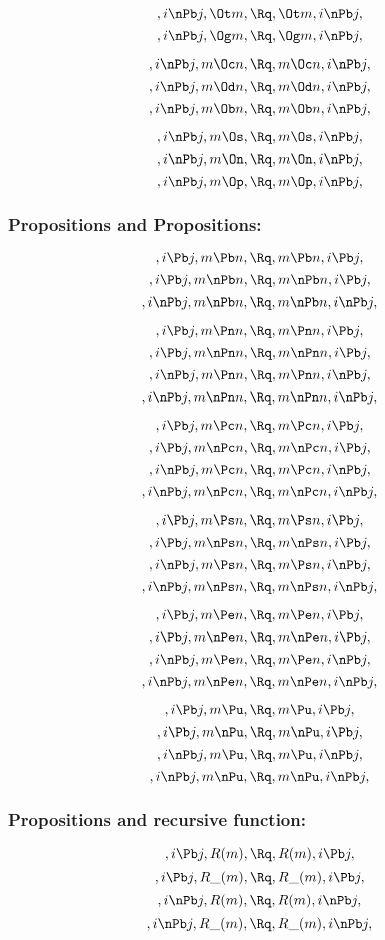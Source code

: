 \bigskip
\bigskip
\[, i \nPb j, \Ot m, \Rq , \Ot m, i \nPb j,\]
\[, i \nPb j, \Og m, \Rq , \Og m, i \nPb j,\]

\[, i \nPb j, m \Oc n, \Rq , m \Oc n, i \nPb j,\]
\[, i \nPb j, m \Od n, \Rq , m \Od n, i \nPb j,\]
\[, i \nPb j, m \Ob n, \Rq , m \Ob n, i \nPb j,\]

\[, i \nPb j, m \Os, \Rq , m \Os, i \nPb j,\]
\[, i \nPb j, m \On, \Rq , m \On, i \nPb j,\]
\[, i \nPb j, m \Op, \Rq , m \Op, i \nPb j,\]


\bigskip
\bigskip
\bigskip
\bigskip
\subsubsection{ Propositions and Propositions:}
\[,i \Pb j, m \Pb n, \Rq , m \Pb n, i \Pb j,\]
\[,i \Pb j, m \nPb n, \Rq , m \nPb n, i \Pb j,\]
\[,i \nPb j, m \nPb n, \Rq , m \nPb n, i \nPb j,\]

\[,i \Pb j, m \Pn n, \Rq , m \Pn n, i \Pb j,\]
\[,i \Pb j, m \nPn n, \Rq , m \nPn n, i \Pb j,\]
\[,i \nPb j, m \Pn n, \Rq , m \Pn n, i \nPb j,\]
\[,i \nPb j, m \nPn n, \Rq , m \nPn n, i \nPb j,\]

\[,i \Pb j, m \Pc n, \Rq , m \Pc n, i \Pb j,\]
\[,i \Pb j, m \nPc n, \Rq , m \nPc n, i \Pb j,\]
\[,i \nPb j, m \Pc n, \Rq , m \Pc n, i \nPb j,\]
\[,i \nPb j, m \nPc n, \Rq , m \nPc n, i \nPb j,\]

\[,i \Pb j, m \Ps n, \Rq , m \Ps n, i \Pb j,\]
\[,i \Pb j, m \nPs n, \Rq , m \nPs n, i \Pb j,\]
\[,i \nPb j, m \Ps n, \Rq , m \Ps n, i \nPb j,\]
\[,i \nPb j, m \nPs n, \Rq , m \nPs n, i \nPb j,\]


\[,i \Pb j, m \Pe n, \Rq , m \Pe n, i \Pb j,\]
\[,i \Pb j, m \nPe n, \Rq , m \nPe n, i \Pb j,\]
\[,i \nPb j, m \Pe n, \Rq , m \Pe n, i \nPb j,\]
\[,i \nPb j, m \nPe n, \Rq , m \nPe n, i \nPb j,\]

\[,i \Pb j, m \Pu, \Rq , m \Pu, i \Pb j,\]
\[,i \Pb j, m \nPu, \Rq , m \nPu, i \Pb j,\]
\[,i \nPb j, m \Pu, \Rq , m \Pu, i \nPb j,\]
\[,i \nPb j, m \nPu, \Rq , m \nPu, i \nPb j,\]



\bigskip
\bigskip
\bigskip
\bigskip
\subsubsection{ Propositions and recursive function:}
\[,i \Pb j, R(m), \Rq , R(m), i \Pb j,\]
\[,i \Pb j, R\_(m), \Rq , R\_(m), i \Pb j,\]
\[,i \nPb j,R(m), \Rq , R(m), i \nPb j,\]
\[,i \nPb j, R\_(m), \Rq , R\_(m), i \nPb j,\]



